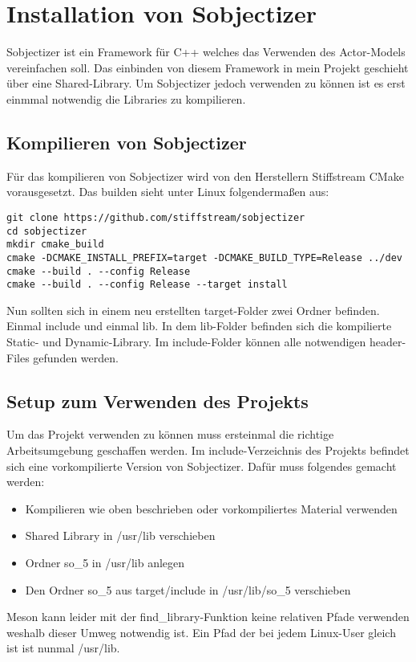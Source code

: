 \chapter{Installation von Sobjectizer}

\vspace{10mm}

Sobjectizer ist ein Framework für C++ welches das Verwenden des Actor-Models vereinfachen soll.
Das einbinden von diesem Framework in mein Projekt geschieht über eine Shared-Library.
Um Sobjectizer jedoch verwenden zu können ist es erst einmmal notwendig die Libraries zu kompilieren.

\section{Kompilieren von Sobjectizer}
Für das kompilieren von Sobjectizer wird von den Herstellern Stiffstream CMake vorausgesetzt.
Das builden sieht unter Linux folgendermaßen aus:

\begin{verbatim}
git clone https://github.com/stiffstream/sobjectizer
cd sobjectizer
mkdir cmake_build
cmake -DCMAKE_INSTALL_PREFIX=target -DCMAKE_BUILD_TYPE=Release ../dev
cmake --build . --config Release
cmake --build . --config Release --target install
\end{verbatim}

Nun sollten sich in einem neu erstellten target-Folder zwei Ordner befinden. Einmal include und einmal
lib. In dem lib-Folder befinden sich die kompilierte Static- und Dynamic-Library. Im include-Folder können
alle notwendigen header-Files gefunden werden.

\newpage

\section{Setup zum Verwenden des Projekts}
Um das Projekt verwenden zu können muss ersteinmal die richtige Arbeitsumgebung geschaffen werden.
Im include-Verzeichnis des Projekts befindet sich eine vorkompilierte Version von Sobjectizer.
Dafür muss folgendes gemacht werden:

\begin{itemize}
  \item Kompilieren wie oben beschrieben oder vorkompiliertes Material verwenden
  \item Shared Library in /usr/lib verschieben
  \item Ordner so\_5 in /usr/lib anlegen
  \item Den Ordner so\_5 aus target/include in /usr/lib/so\_5 verschieben
\end{itemize}

Meson kann leider mit der find\_library-Funktion keine relativen Pfade verwenden weshalb dieser Umweg notwendig
ist. Ein Pfad der bei jedem Linux-User gleich ist ist nunmal /usr/lib.

